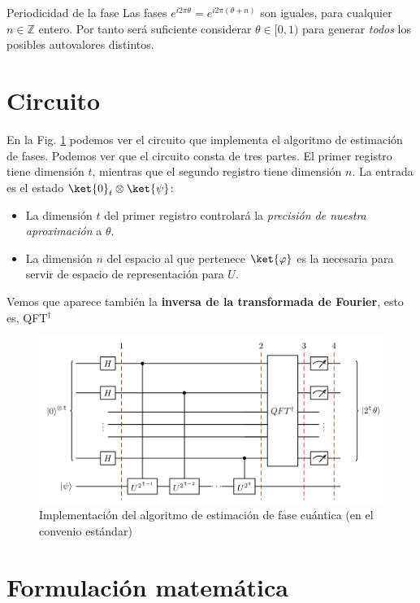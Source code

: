 \documentclass[a4paper,11pt]{book} %
\numberwithin{equation}{chapter}
\begin{document}
	\begin{mybox_blue}{Periodicidad de la fase}
	Las fases  $e^{i2\pi \theta}=e^{i2\pi (\theta+n)}$  son iguales, para cualquier $n\in {\mathbb Z}$ entero. Por tanto será suficiente considerar  $\theta \in [0,1)$ para generar \textit{todos} los  posibles autovalores distintos.
	\end{mybox_blue}

\section{Circuito}

En la Fig. \ref{Fig-QPE} podemos ver el circuito que implementa el algoritmo de estimación de fases. Podemos ver que el circuito consta de tres partes. El primer registro tiene dimensión $t$, mientras que el segundo registro tiene dimensión $n$. La entrada es el estado $\ket{0}_t \otimes \ket{\psi}$:
\begin{itemize}
	\item La dimensión $t$ del primer registro controlará la \textit{precisión de nuestra aproximación} a $\theta$. 
	\item La dimensión $n$ del espacio al que pertenece $\ket{\varphi}$  es la necesaria para servir de espacio de representación para $U$.
\end{itemize}
Vemos que aparece también la \textbf{inversa de la transformada de Fourier}, esto es, QFT$^\dagger$

\begin{figure}[t]
\centering 
\includegraphics[width=0.8\linewidth]{Figuras/Fig-QPE-Circuito.png}
\caption{Implementación del algoritmo de estimación de fase cuántica (en el convenio estándar)}
\label{Fig-QPE}
\end{figure}



\section{Formulación matemática}
\end{document}

